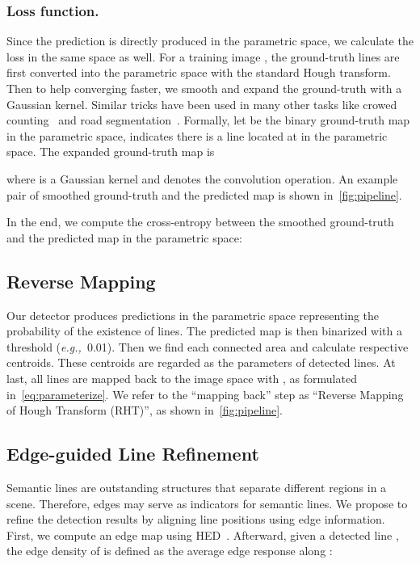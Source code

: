 \documentclass[10pt,journal,cspaper,compsoc]{IEEEtran}
\def\eg{\emph{e.g.,~}}
\begin{document}
\subsubsection{Loss function.}\label{sec:loss-func}
Since the prediction is directly produced in the parametric space,
we calculate the loss in the same space as well.
For a training image , the ground-truth lines are first converted into
the parametric space with the standard Hough transform.
Then to help converging faster, we smooth and expand the ground-truth with a
Gaussian kernel.
Similar tricks have been used in many other tasks like
crowed counting~\cite{liu2019context,cheng2019learning} and road segmentation~\cite{VecRoad_20CVPR}.
Formally, let  be the binary ground-truth map in the parametric space,
 indicates there is a line located at  in the parametric space.
The expanded ground-truth map is

where  is a  Gaussian kernel and  denotes the convolution operation.
An example pair of smoothed ground-truth and the predicted map is shown
in~\cref{fig:pipeline}.


In the end, we compute the cross-entropy between the smoothed ground-truth
and the predicted map in the parametric space:




\subsection{Reverse Mapping}\label{sec:reverse}
Our detector produces predictions in the parametric space representing
the probability of the existence of lines.
The predicted map is then binarized with a threshold (\eg 0.01).
Then we find each connected area and calculate respective centroids.
These centroids are regarded as the parameters of detected lines.
At last, all lines are mapped back to the image space with
, as formulated in~\cref{eq:parameterize}.
We refer to the ``mapping back'' step as ``Reverse Mapping of Hough Transform (RHT)'',
as shown in~\cref{fig:pipeline}.


\subsection{Edge-guided Line Refinement}\label{sec:refine} 
Semantic lines are outstanding structures that
separate different regions in a scene.
Therefore, edges may serve as indicators for semantic lines.
We propose to refine the detection results by aligning line positions using
edge information.
First, we compute an edge map  using HED~\cite{xie2015holistically}.
Afterward, given a detected line , the edge density of  is defined as the average
edge response along :
\end{document}
